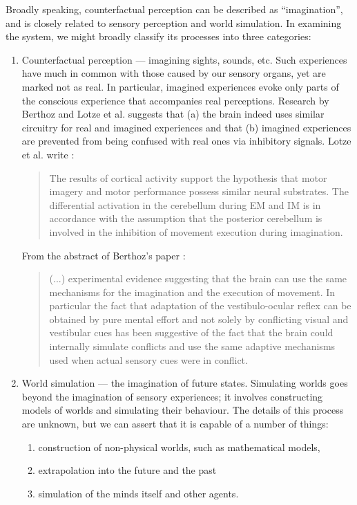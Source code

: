 \documentclass[]{scrartcl}
\theoremstyle{break}
\begin{document}
Broadly speaking, counterfactual perception can be described as ``imagination'', and is closely related to sensory perception and world simulation. In examining the system, we might broadly classify its processes into three categories:

\begin{enumerate}
	\item Counterfactual perception --- imagining sights, sounds, etc. Such experiences have much in common with those caused by our sensory organs, yet are marked not as real. In particular, imagined experiences evoke only parts of the conscious experience that accompanies real perceptions. Research by Berthoz and Lotze et al. suggests that (a) the brain indeed uses similar circuitry for real and imagined experiences and that (b) imagined experiences are prevented from being confused with real ones via inhibitory signals. Lotze et al. write \cite{lotze1999}:
	\begin{quote}
		The results of cortical activity support the hypothesis that motor imagery and motor performance possess similar neural substrates. The differential activation in the cerebellum during EM and IM is in accordance with the assumption that the posterior cerebellum is involved in the inhibition of movement execution during imagination.
	\end{quote}
	
	From the abstract of Berthoz's paper \cite{8713551}:
	
	\begin{quotation}
		(...) experimental evidence suggesting that the brain can use the same mechanisms for the imagination and the execution of movement. In particular the fact that adaptation of the vestibulo-ocular reflex can be obtained by pure mental effort and not solely by conflicting visual and vestibular cues has been suggestive of the fact that the brain could internally simulate conflicts and use the same adaptive mechanisms used when actual sensory cues were in conflict.
	\end{quotation}
	
	\item World simulation --- the imagination of future states. Simulating worlds goes beyond the imagination of sensory experiences; it involves constructing models of worlds and simulating their behaviour. The details of this process are unknown, but we can assert that it is capable of a number of things:
	\begin{enumerate}
		\item construction of non-physical worlds, such as mathematical models,
		\item extrapolation into the future and the past
		\item simulation of the minds itself and other agents.
	\end{enumerate}
	

\end{enumerate}
\end{document}
